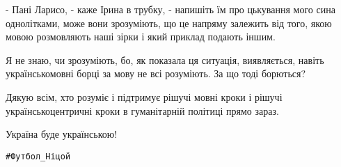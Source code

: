 - Пані Ларисо, - каже Ірина в трубку, - напишіть їм про цькування мого сина
однолітками, може вони зрозуміють, що це напряму залежить від того, якою мовою
розмовляють наші зірки і який приклад подають іншим. 

Я не знаю, чи зрозуміють, бо, як показала ця ситуація, виявляється, навіть
українськомовні борці за мову не всі розуміють. За що тоді борються? 

Дякую всім, хто розуміє і підтримує рішучі мовні кроки і рішучі
українськоцентричні кроки в гуманітарній політиці прямо зараз.

Україна буде українською!

\verb|#Футбол_Ніцой|

